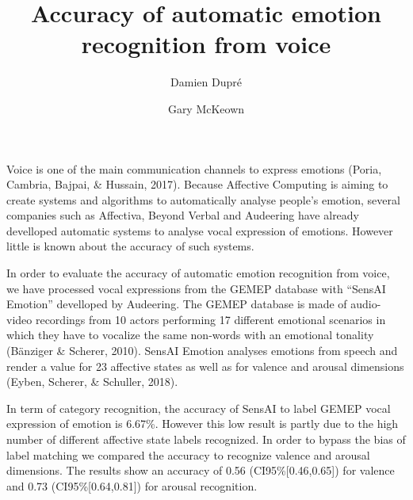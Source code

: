 \documentclass[]{elsarticle} %
\begin{document}
\begin{frontmatter}

  \title{Accuracy of automatic emotion recognition from voice}
    \author[University College Dublin]{Damien Dupré}
    \author[Queen's University Belfast]{Gary McKeown}
  
      \address[University College Dublin]{The Insight Centre for Data Analytics, University College Dublin,
Republic of Ireland}
    \address[Queen's University Belfast]{School of Psychology, Queen's University Belfast, United Kingdom}
  
  \begin{abstract}
  
  \end{abstract}
  
 \end{frontmatter}

Voice is one of the main communication channels to express emotions
(Poria, Cambria, Bajpai, \& Hussain, 2017). Because Affective Computing
is aiming to create systems and algorithms to automatically analyse
people's emotion, several companies such as Affectiva, Beyond Verbal and
Audeering have already develloped automatic systems to analyse vocal
expression of emotions. However little is known about the accuracy of
such systems.

In order to evaluate the accuracy of automatic emotion recognition from
voice, we have processed vocal expressions from the GEMEP database with
``SensAI Emotion'' develloped by Audeering. The GEMEP database is made
of audio-video recordings from 10 actors performing 17 different
emotional scenarios in which they have to vocalize the same non-words
with an emotional tonality (Bänziger \& Scherer, 2010). SensAI Emotion
analyses emotions from speech and render a value for 23 affective states
as well as for valence and arousal dimensions (Eyben, Scherer, \&
Schuller, 2018).

In term of category recognition, the accuracy of SensAI to label GEMEP
vocal expression of emotion is 6.67\%. However this low result is partly
due to the high number of different affective state labels recognized.
In order to bypass the bias of label matching we compared the accuracy
to recognize valence and arousal dimensions. The results show an
accuracy of 0.56 (CI95\%{[}0.46,0.65{]}) for valence and 0.73
(CI95\%{[}0.64,0.81{]}) for arousal recognition.
\end{document}
